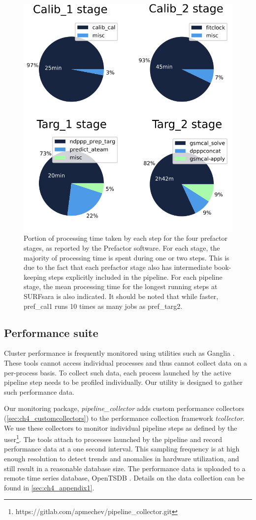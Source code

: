 \begin{figure}[H]
    \centering
    \includegraphics[width=0.5\linewidth]{ch4/figures/fig2/4pies_thesis.png}
      \caption[Portion of processing time taken by each step for the four prefactor stages.]{Portion of processing time taken by each step for the four prefactor stages, as reported by the Prefactor software. For each stage, the majority of processing time is spent during one or two steps. This is due to the fact that each prefactor stage also has intermediate book-keeping steps explicitly included in the pipeline. For each pipeline stage, the mean processing time for the longest running steps at SURFsara is also indicated. It should be noted that while faster, pref\_cal1 runs 10 times as many jobs as pref\_targ2. }
	\label{fig:ch4_4_steps_pies}
\end{figure}


\subsection{Performance suite}
Cluster performance is frequently monitored using utilities such as Ganglia \citep[][discussed in Section \ref{sec:ch4_related}]{ganglia}. These tools cannot access individual processes and thus cannot collect data on a per-process basis. To collect such data, each process launched by the active pipeline step needs to be profiled individually. Our utility is designed to gather such performance data.

Our monitoring package, \textit{pipeline\_collector} adds custom performance collectors (\ref{sec:ch4_customcollectors}) to the performance collection framework \textit{tcollector}. We use these collectors to monitor individual pipeline steps as defined by the user\footnote{https://gitlab.com/apmechev/pipeline\_collector.git}. The tools attach to processes launched by the pipeline and record performance data at a one second interval. This sampling frequency is at high enough resolution to detect trends and anomalies in hardware utilization, and still result in a reasonable database size. The performance data is uploaded to a remote time series database, OpenTSDB \citep{opentsdbsite}. Details on the data collection can be found in  \ref{sec:ch4_appendix1}.

